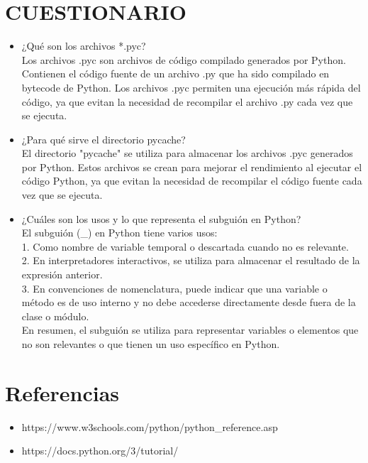 \documentclass{article}
\begin{document}
\section{CUESTIONARIO}
	\begin{itemize}
		\item ¿Qué son los archivos *.pyc? \\
        Los archivos .pyc son archivos de código compilado generados por Python. Contienen el código fuente de un archivo .py que ha sido compilado en bytecode de Python. Los archivos .pyc permiten una ejecución más rápida del código, ya que evitan la necesidad de recompilar el archivo .py cada vez que se ejecuta.
  \item ¿Para qué sirve el directorio pycache?\\
        El directorio "pycache" se utiliza para almacenar los archivos .pyc generados por Python. Estos archivos se crean para mejorar el rendimiento al ejecutar el código Python, ya que evitan la necesidad de recompilar el código fuente cada vez que se ejecuta.        
  \item ¿Cuáles son los usos y lo que representa el subguión en Python?\\
        El subguión (\_) en Python tiene varios usos:\\
1. Como nombre de variable temporal o descartada cuando no es relevante.\\
2. En interpretadores interactivos, se utiliza para almacenar el resultado de la expresión anterior.\\
3. En convenciones de nomenclatura, puede indicar que una variable o método es de uso interno y no debe accederse directamente desde fuera de la clase o módulo.\\
En resumen, el subguión se utiliza para representar variables o elementos que no son relevantes o que tienen un uso específico en Python.
        
	\end{itemize}		
\clearpage

\section{Referencias}
\begin{itemize}			
	\item https://www.w3schools.com/python/python\_reference.asp
 \item https://docs.python.org/3/tutorial/
\end{itemize}	
	
%
%
%
			
\end{document}
